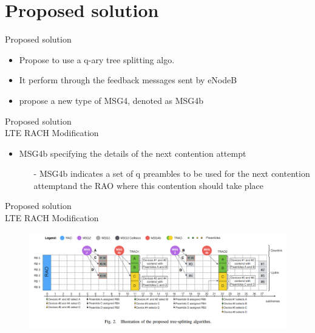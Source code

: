 \documentclass{beamer}
\begin{document}
\section{Proposed solution}
\begin{frame}{{Proposed solution}}
    \begin{itemize}
        \item{Propose to use a q-ary tree splitting algo.}
        \item{It perform through the feedback messages sent by eNodeB}
        \item{propose a new type of MSG4, denoted as MSG4b}
        
    \end{itemize}
\end{frame}
\begin{frame}{{Proposed solution}\\LTE RACH Modification}
    \begin{itemize}
        
        \item{MSG4b specifying the details of the next contention attempt}
        \begin{itemize}    
            \item[-]{MSG4b indicates a set of q preambles to be used for the next contention attemptand the RAO where this contention should take place}
        \end{itemize}
    \end{itemize}
\end{frame}
\begin{frame}{{Proposed solution}\\LTE RACH Modification}
    \begin{figure}[t]
        \centering
        \includegraphics[width=1.1\textwidth]{figures/c.png}
    \end{figure}
\end{frame}
\end{document}

